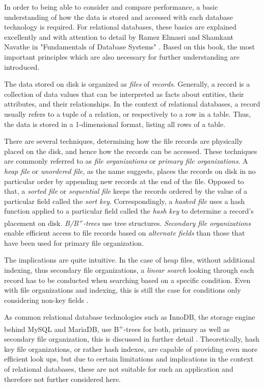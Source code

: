 In order to being able to consider and compare performance, a basic understanding of how the data is stored and accessed with each database technology is required. For relational databases, these basics are explained excellently and with attention to detail by Ramez Elmasri and Shamkant Navathe in "Fundamentals of Database Systems" \cite{DatabaseFundamentals}. Based on this book, the most important principles which are also necessary for further understanding are introduced.\par
The data stored on disk is organized as \emph{files} of \emph{records}. Generally, a record is a collection of data values that can be interpreted as facts about entities, their attributes, and their relationships. In the context of relational databases, a record usually refers to a tuple of a relation, or respectively to a row in a table. Thus, the data is stored in a 1-dimensional format, listing all rows of a table.\par
There are several techniques, determining how the file records are physically placed on the disk, and hence how the records can be accessed. These techniques are commonly referred to as \emph{file organizations} or \emph{primary file organizations}. A \emph{heap file} or \emph{unordered file}, as the name suggests, places the records on disk in no particular order by appending new records at the end of the file. Opposed to that, a \emph{sorted file} or \emph{sequential file} keeps the records ordered by the value of a particular field called the \emph{sort key}. Correspondingly, a \emph{hashed file} uses a hash function applied to a particular field called the \emph{hash key} to determine a record's placement on disk. \emph{B/B\textsuperscript{+}-trees} use tree structures. \emph{Secondary file organizations} enable efficient access to file records based on \emph{alternate fields} than those that have been used for primary file organization.\par
The implications are quite intuitive. In the case of heap files, without additional indexing, thus secondary file organizations, a \emph{linear search} looking through each record has to be conducted when searching based on a specific condition. Even with file organizations and indexing, this is still the case for conditions only considering non-key fields \cite{DatabaseFundamentals}.\par
As common relational database technologies such as InnoDB, the storage engine behind MySQL and MariaDB, use B\textsuperscript{+}-trees for both, primary as well as secondary file organization, this is discussed in further detail \cite{InnoDB}. Theoretically, hash key file organizations, or rather hash indexes, are capable of providing even more efficient look ups, but due to certain limitations and implications in the context of relational databases, these are not suitable for such an application and therefore not further considered here.

